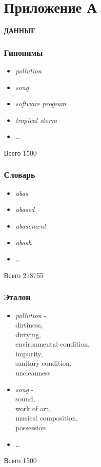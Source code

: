\section*{Приложение А}
\label{sec:Appendix_1} 
\large

\textbf{ДАННЫЕ}

\subsubsection{Гипонимы}
\begin{itemize}
\item \textit{pollution}
\item \textit{song}
\item \textit{software program}
\item \textit{tropical storm}
\item \ldots
\end{itemize}
Всего 1500


\subsubsection{Словарь}
\begin{itemize}
\item \textit{abas}
\item \textit{abased}
\item \textit{abasement}
\item \textit{abash}
\item \ldots
\end{itemize}
Всего 218755

\subsubsection{Эталон}
\begin{itemize}
\item \textit{pollution} -\\
dirtiness,\\
dirtying,\\
environmental condition,\\
impurity,\\
sanitary condition,\\
uncleanness
\item \textit{song} -\\
sound,\\
work of art,\\
musical composition,\\
possession\\
\item \ldots
\end{itemize}
Всего 1500

